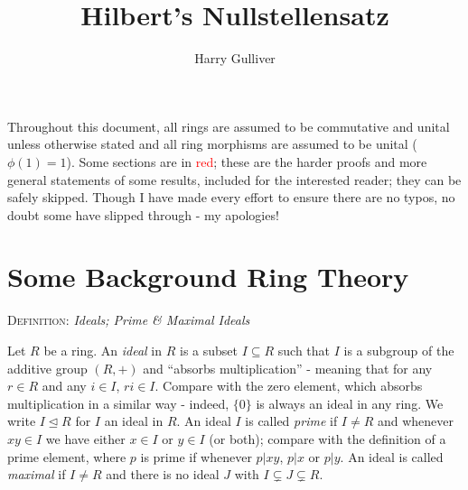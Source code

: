 \documentclass[12pt,a4paper]{article}
\title{Hilbert's Nullstellensatz}
\author{Harry Gulliver}
\date{}
\newcommand{\defn}[1]{\noindent\textsc{\large Definition:}  \textit{\large #1}\par}
\newcommand{\red}[1]{\textcolor{red}{#1}}
\newcommand{\gap}{\par \vspace{5mm}}
\let\ideal\trianglelefteq
\begin{document}
\maketitle



Throughout this document, all rings are assumed to be commutative and unital unless otherwise stated and all ring morphisms are assumed to be unital ($\phi(1)=1$). Some sections are in \red{red}; these are the harder proofs and more general statements of some results, included for the interested reader; they can be safely skipped. Though I have made every effort to ensure there are no typos, no doubt some have slipped through - my apologies!


\section{Some Background Ring Theory}

\defn{Ideals; Prime \& Maximal Ideals}
Let $R$ be a ring. An \textit{ideal} in $R$ is a subset $I\subseteq R$ such that $I$ is a subgroup of the additive group $(R,+)$ and ``absorbs multiplication'' - meaning that for any $r\in R$ and any $i\in I$, $ri\in I$. Compare with the zero element, which absorbs multiplication in a similar way - indeed, $\{0\}$ is always an ideal in any ring. We write $I\ideal R$ for $I$ an ideal in $R$. An ideal $I$ is called \textit{prime} if $I\neq R$ and whenever $xy\in I$ we have either $x\in I$ or $y\in I$ (or both); compare with the definition of a prime element, where $p$ is prime if whenever $p|xy$, $p|x$ or $p|y$. An ideal is called \textit{maximal} if $I\neq R$ and there is no ideal $J$ with $I\subsetneq J\subsetneq R$.\gap
\end{document}
